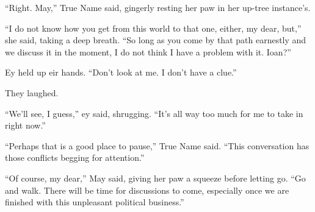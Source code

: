 ``Right. May,'' True Name said, gingerly resting her paw in her up-tree instance's.

``I do not know how you get from this world to that one, either, my dear, but,'' she said, taking a deep breath. ``So long as you come by that path earnestly and we discuss it in the moment, I do not think I have a problem with it. Ioan?''

Ey held up eir hands. ``Don't look at me. I don't have a clue.''

They laughed.

``We'll see, I guess,'' ey said, shrugging. ``It's all way too much for me to take in right now.''

``Perhaps that is a good place to pause,'' True Name said. ``This conversation has those conflicts begging for attention.''

``Of course, my dear,'' May said, giving her paw a squeeze before letting go. ``Go and walk. There will be time for discussions to come, especially once we are finished with this unpleasant political business.''
